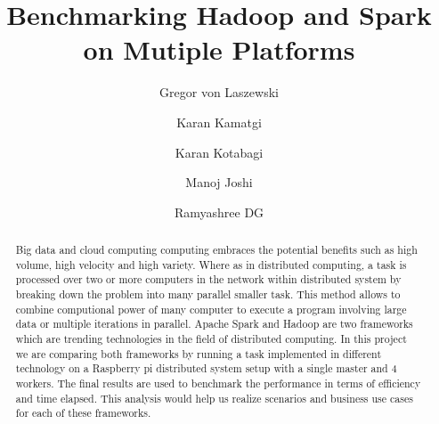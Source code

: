 
\title{Benchmarking Hadoop and Spark on Mutiple Platforms}

\author{Gregor von Laszewski}

\author{Karan Kamatgi}

\author{Karan Kotabagi}

\author{Manoj Joshi}

\author{Ramyashree DG}

\renewcommand{\shortauthors}{G. v. Laszewski, Karan Kamatgi, 
  Karan Kotabagi, Manoj Joshi, Ramyashree DG}
  
\begin{abstract}

Big data and cloud computing computing embraces the potential benefits such as 
high volume, high velocity and high variety. Where as in distributed computing, 
a task is processed over two or more computers in the network within distributed
 system by breaking down the problem into many parallel smaller task. This 
 method allows to combine computional power of many computer to execute a 
 program involving large data or multiple iterations in parallel. Apache Spark 
 and Hadoop are two frameworks which are trending technologies in the field of 
 distributed computing. In this project we are comparing both frameworks by 
 running a task implemented in different technology on a Raspberry pi 
 distributed system setup with a single master and 4 workers. The final results 
 are used to benchmark the performance in terms of efficiency and time elapsed. 
 This analysis would help us realize scenarios and business use cases for each 
 of these frameworks.

\end{abstract}

